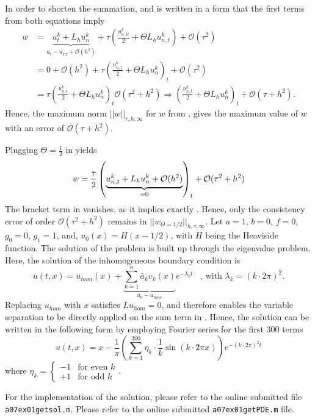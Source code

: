 %
In order to shorten the summation,  and  is written in a form that the first terms from both equations imply 
\begin{align}
	\nonumber
	w & = \underbrace{u_t^k + L_h u^k_n}_{ u_t - u_{xx} + \mathcal{O}(h^2)} + \tau \left( \frac{u_{n,tt}^k}{2} + \Theta L_h u_{n,t}^k \right) + \mathcal{O}(\tau^2) \\
	\nonumber
	  & = 0 + \mathcal{O}(h^2) + \tau \left( \frac{u_{n,t}^k}{2} + \Theta L_h u_{n}^k\right)_t + \mathcal{O}(\tau^2) 												  \\
	\label{eq:w1}
	  & = \tau \left( \frac{u_{n,t}^k}{2} + \Theta L_h u_{n}^k\right)_t \mathcal{O}(\tau^2 + h^2)
		  \Rightarrow \left( \frac{u_{n,t}^k}{2} + \Theta L_h u_{n}^k\right)_t + \mathcal{O}(\tau + h^2) \text{.}
\end{align}
%
Hence, the maximum norm $||w||_{\tau, h, \infty}$ for $w$ from , gives the maximum value of $w$ with an error of $\mathcal{O}(\tau + h^2)$.
\par
Plugging $\Theta = \frac{1}{2}$ in  yields
\begin{equation}
	\label{eq:w2}
	w = \frac{\tau}{2} \left( \underbrace{u_{n,t}^k + L_h u_{n}^k + \mathcal{O}(h^2)}_{=0} \right)_t + \mathcal{O}(\tau^2 + h^2) \\
\end{equation}
The bracket term in  vanishes, as it implies exactly .
Hence, only the consistency error of order $\mathcal{O}(\tau^2 + h^2)$ remains in $||w_{\Theta = 1/2}||_{h, \tau, \infty}$.
%
Let	$a   = 1$,
	$b   = 0$,
	$f   = 0$,
	$g_0 = 0$,
	$g_1 = 1$, and,
	$u_0(x) = H(x - 1/2)$, with $H$ being the Heaviside function.
The solution of the problem is built up through the eigenvalue problem.
Here, the solution of the inhomogeneous boundary condition is
\begin{equation}
	\label{eq:solution}
	u(t,x) = u_{hom}(x) + \underbrace{\sum_{k=1}^{n}\bar{a}_k v_k(x)}_{u_0 - u_{hom}} e^{-\lambda_k t} \;\;\; \text{, with } \lambda_k = (k \cdot 2 \pi)^2 \text{.}
\end{equation}
Replacing $u_{hom}$ with $x$ satisfies $Lu_{hom} = 0$, and therefore enables the variable separation to be directly applied on the sum term in .
Hence, the solution can be written in the following form by employing Fourier series for the first 300 terms
\begin{equation}
	\label{eq:solutionNew}
	u(t,x) = x - \frac{1}{\pi}\left( \sum_{k=1}^{300} \eta_k \cdot \frac{1}{k} \sin{(k \cdot 2\pi x)} \right) e^{-(k \cdot 2 \pi)^2 t}
\end{equation}
where $ \eta_k = 
\begin{cases}
	-1 &\text{for even }k\\
	+1 &\text{for odd }k
\end{cases}$.
\par
For the implementation of the solution, please refer to the online submitted file \\ \texttt{a07ex01getsol.m}.
%
Please refer to the online submitted \texttt{a07ex01getPDE.m} file.

